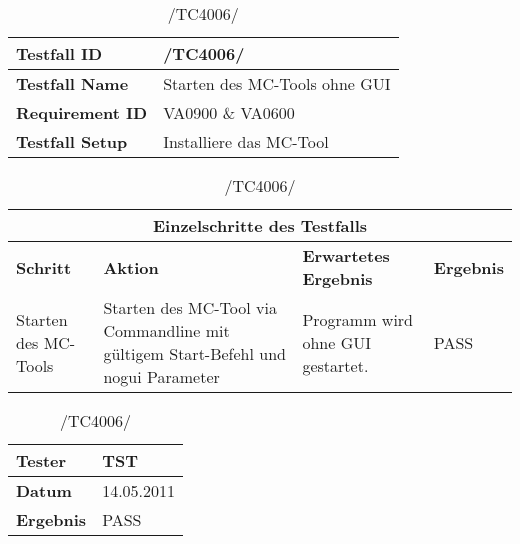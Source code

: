\begin{table}[h]
    \caption{/TC4006/}
    \label{tab:TC4006}
    \begin{center}
        \begin{tabular}{|p{3.5cm}|p{11cm}|}
            \hline
                \textbf{Testfall ID} & /TC4006/\\
            \hline
                \textbf{Testfall Name} & Starten des MC-Tools ohne GUI\\
            \hline
                \textbf{Requirement ID} & VA0900 \& VA0600\\
            \hline
                \textbf{Testfall Setup} & Installiere das MC-Tool\\
            \hline
        \end{tabular}
        \begin{tabular}{|p{2cm}|p{3.9cm}|p{3.9cm}|p{3.8cm}|}
            \multicolumn{4}{|c|}{\textbf{Einzelschritte des Testfalls}} \\
            \hline
                \textbf{Schritt} & \textbf{Aktion} & \textbf{Erwartetes
                Ergebnis} & \textbf{Ergebnis}\\
            \hline
                Starten des MC-Tools & Starten des MC-Tool via Commandline mit
                gültigem Start-Befehl und nogui Parameter & Programm wird ohne
                GUI gestartet. & PASS\\
            \hline
        \end{tabular}
        \begin{tabular}{|p{3.5cm}|p{11cm}|}
                \textbf{Tester} & TST\\
            \hline
                \textbf{Datum} & 14.05.2011\\
            \hline
                \textbf{Ergebnis} & \cellcolor{green} PASS \\
            \hline
        \end{tabular}
    \end{center}
\end{table}